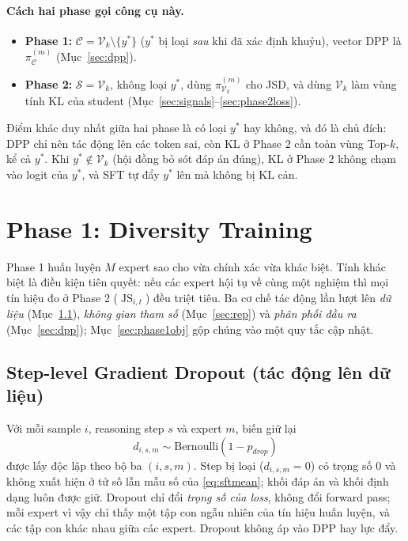 \documentclass[12pt,a4paper]{article}
\theoremstyle{plain}
\DeclareMathOperator{\JS}{JS}
\newcommand{\Vk}{\mathcal V_k}
\newcommand{\Cset}{\mathcal C}
\newcommand{\ytar}{y^{*}}
\begin{document}
\paragraph{Cách hai phase gọi công cụ này.}
\begin{itemize}
\item \textbf{Phase 1:} $\Cset=\Vk\setminus\{\ytar\}$ ($\ytar$ bị loại \emph{sau} khi đã xác định khuỷu), vector DPP là $\pi^{(m)}_{\Cset}$ (Mục~\ref{sec:dpp}).
\item \textbf{Phase 2:} $\mathcal S=\Vk$, không loại $\ytar$, dùng $\pi^{(m)}_{\Vk}$ cho JSD, và dùng $\Vk$ làm vùng tính KL của student (Mục~\ref{sec:signals}--\ref{sec:phase2loss}).
\end{itemize}
Điểm khác duy nhất giữa hai phase là có loại $\ytar$ hay không, và đó là chủ đích: DPP chỉ nên tác động lên các token sai, còn KL ở Phase 2 cần toàn vùng Top-$k$, kể cả $\ytar$. Khi $\ytar\notin\Vk$ (hội đồng bỏ sót đáp án đúng), KL ở Phase 2 không chạm vào logit của $\ytar$, và SFT tự đẩy $\ytar$ lên mà không bị KL cản.

\section{Phase 1: Diversity Training}
\label{sec:phase1}

Phase 1 huấn luyện $M$ expert sao cho vừa chính xác vừa khác biệt. Tính khác biệt là điều kiện tiên quyết: nếu các expert hội tụ về cùng một nghiệm thì mọi tín hiệu đo ở Phase 2 ($\JS_{i,t}$) đều triệt tiêu. Ba cơ chế tác động lần lượt lên \emph{dữ liệu} (Mục~\ref{sec:gdrop}), \emph{không gian tham số} (Mục~\ref{sec:rep}) và \emph{phân phối đầu ra} (Mục~\ref{sec:dpp}); Mục~\ref{sec:phase1obj} gộp chúng vào một quy tắc cập nhật.

\subsection{Step-level Gradient Dropout (tác động lên dữ liệu)}
\label{sec:gdrop}

Với mỗi sample $i$, reasoning step $s$ và expert $m$, biến giữ lại
\begin{equation}
\label{eq:graddropout}
d_{i,s,m}\sim\mathrm{Bernoulli}(1-p_{drop})
\end{equation}
được lấy độc lập theo bộ ba $(i,s,m)$. Step bị loại ($d_{i,s,m}=0$) có trọng số $0$ và không xuất hiện ở tử số lẫn mẫu số của \eqref{eq:sftmean}; khối đáp án và khối định dạng luôn được giữ. Dropout chỉ đổi \emph{trọng số của loss}, không đổi forward pass; mỗi expert vì vậy chỉ thấy một tập con ngẫu nhiên của tín hiệu huấn luyện, và các tập con khác nhau giữa các expert. Dropout không áp vào DPP hay lực đẩy.
\end{document}
